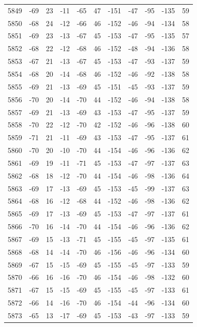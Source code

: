 \begin{table}[H]
\begin{tabular}{lllllllllll}
5849 & -69 & 23 & -11 & -65 & 47 & -151 & -47 & -95 & -135 & 59 \\
5850 & -68 & 24 & -12 & -66 & 46 & -152 & -46 & -94 & -134 & 58 \\
5851 & -69 & 23 & -13 & -67 & 45 & -153 & -47 & -95 & -135 & 57 \\
5852 & -68 & 22 & -12 & -68 & 46 & -152 & -48 & -94 & -136 & 58 \\
5853 & -67 & 21 & -13 & -67 & 45 & -153 & -47 & -93 & -137 & 59 \\
5854 & -68 & 20 & -14 & -68 & 46 & -152 & -46 & -92 & -138 & 58 \\
5855 & -69 & 21 & -13 & -69 & 45 & -151 & -45 & -93 & -137 & 59 \\
5856 & -70 & 20 & -14 & -70 & 44 & -152 & -46 & -94 & -138 & 58 \\
5857 & -69 & 21 & -13 & -69 & 43 & -153 & -47 & -95 & -137 & 59 \\
5858 & -70 & 22 & -12 & -70 & 42 & -152 & -46 & -96 & -138 & 60 \\
5859 & -71 & 21 & -11 & -69 & 43 & -153 & -47 & -95 & -137 & 61 \\
5860 & -70 & 20 & -10 & -70 & 44 & -154 & -46 & -96 & -136 & 62 \\
5861 & -69 & 19 & -11 & -71 & 45 & -153 & -47 & -97 & -137 & 63 \\
5862 & -68 & 18 & -12 & -70 & 44 & -154 & -46 & -98 & -136 & 64 \\
5863 & -69 & 17 & -13 & -69 & 45 & -153 & -45 & -99 & -137 & 63 \\
5864 & -68 & 16 & -12 & -68 & 44 & -152 & -46 & -98 & -136 & 62 \\
5865 & -69 & 17 & -13 & -69 & 45 & -153 & -47 & -97 & -137 & 61 \\
5866 & -70 & 16 & -14 & -70 & 44 & -154 & -46 & -96 & -136 & 62 \\
5867 & -69 & 15 & -13 & -71 & 45 & -155 & -45 & -97 & -135 & 61 \\
5868 & -68 & 14 & -14 & -70 & 46 & -156 & -46 & -96 & -134 & 60 \\
5869 & -67 & 15 & -15 & -69 & 45 & -155 & -45 & -97 & -133 & 59 \\
5870 & -66 & 16 & -16 & -70 & 46 & -154 & -46 & -98 & -132 & 60 \\
5871 & -67 & 15 & -15 & -69 & 45 & -155 & -45 & -97 & -133 & 61 \\
5872 & -66 & 14 & -16 & -70 & 46 & -154 & -44 & -96 & -134 & 60 \\
5873 & -65 & 13 & -17 & -69 & 45 & -153 & -43 & -97 & -133 & 59 \\

\end{tabular}
\end{table}

